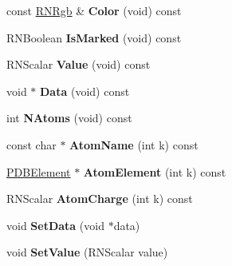 \begin{DoxyCompactItemize}
\item 
const \hyperlink{class_r_n_rgb}{R\+N\+Rgb} \& {\bfseries Color} (void) const \hypertarget{class_p_d_b_amino_acid_a38ea126e9f292eb8228c9165e83ce7e4}{}\label{class_p_d_b_amino_acid_a38ea126e9f292eb8228c9165e83ce7e4}

\item 
R\+N\+Boolean {\bfseries Is\+Marked} (void) const \hypertarget{class_p_d_b_amino_acid_a40b5a7a9066a99fc0e489a8f49ca35aa}{}\label{class_p_d_b_amino_acid_a40b5a7a9066a99fc0e489a8f49ca35aa}

\item 
R\+N\+Scalar {\bfseries Value} (void) const \hypertarget{class_p_d_b_amino_acid_a6bc554ee1ab5ad2e875f82cbd64d3c7f}{}\label{class_p_d_b_amino_acid_a6bc554ee1ab5ad2e875f82cbd64d3c7f}

\item 
void $\ast$ {\bfseries Data} (void) const \hypertarget{class_p_d_b_amino_acid_a1a7cfde4a679d532c99dca0b0c9c7070}{}\label{class_p_d_b_amino_acid_a1a7cfde4a679d532c99dca0b0c9c7070}

\item 
int {\bfseries N\+Atoms} (void) const \hypertarget{class_p_d_b_amino_acid_aed88bee78385101f7626b4fbb9d74ad8}{}\label{class_p_d_b_amino_acid_aed88bee78385101f7626b4fbb9d74ad8}

\item 
const char $\ast$ {\bfseries Atom\+Name} (int k) const \hypertarget{class_p_d_b_amino_acid_a2756aa70c82203e34e075fa000300db3}{}\label{class_p_d_b_amino_acid_a2756aa70c82203e34e075fa000300db3}

\item 
\hyperlink{class_p_d_b_element}{P\+D\+B\+Element} $\ast$ {\bfseries Atom\+Element} (int k) const \hypertarget{class_p_d_b_amino_acid_ac18aa630a5d8ac0b6b37169dcf27ee6f}{}\label{class_p_d_b_amino_acid_ac18aa630a5d8ac0b6b37169dcf27ee6f}

\item 
R\+N\+Scalar {\bfseries Atom\+Charge} (int k) const \hypertarget{class_p_d_b_amino_acid_a56bb32b422e25b3e0551806163298b0e}{}\label{class_p_d_b_amino_acid_a56bb32b422e25b3e0551806163298b0e}

\item 
void {\bfseries Set\+Data} (void $\ast$data)\hypertarget{class_p_d_b_amino_acid_ad8525ccd4cb6fceabeb352c7ebc98c98}{}\label{class_p_d_b_amino_acid_ad8525ccd4cb6fceabeb352c7ebc98c98}

\item 
void {\bfseries Set\+Value} (R\+N\+Scalar value)\hypertarget{class_p_d_b_amino_acid_a6f17d8c8b66857b2ce812135bd61cd69}{}\label{class_p_d_b_amino_acid_a6f17d8c8b66857b2ce812135bd61cd69}


\end{DoxyCompactItemize}
